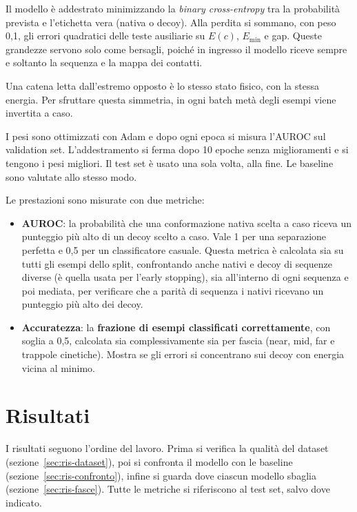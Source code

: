 \documentclass[11pt,a4paper]{article}
\newcommand{\Emin}{E_{\min}}
\begin{document}
Il modello è addestrato minimizzando la \emph{binary cross-entropy} tra la probabilità prevista e l'etichetta vera (nativa o decoy). Alla perdita si sommano, con peso 0,1, gli errori quadratici delle teste ausiliarie su $E(c)$, $\Emin$ e gap. Queste grandezze servono solo come bersagli, poiché in ingresso il modello riceve sempre e soltanto la sequenza e la mappa dei contatti.

Una catena letta dall'estremo opposto è lo stesso stato fisico, con la stessa energia. Per sfruttare questa simmetria, in ogni batch metà degli esempi viene invertita a caso.

I pesi sono ottimizzati con Adam e dopo ogni epoca si misura l'AUROC sul validation set. L'addestramento si ferma dopo 10 epoche senza miglioramenti e si tengono i pesi migliori. Il test set è usato una sola volta, alla fine. Le baseline sono valutate allo stesso modo.

Le prestazioni sono misurate con due metriche:
\begin{itemize}
  \item \textbf{AUROC}: la probabilità che una conformazione nativa scelta a caso riceva un punteggio più alto di un decoy scelto a caso. Vale 1 per una separazione perfetta e 0,5 per un classificatore casuale. Questa metrica è calcolata sia su tutti gli esempi dello split, confrontando anche nativi e decoy di sequenze diverse (è quella usata per l’early stopping), sia all’interno di ogni sequenza e poi mediata, per verificare che a parità di sequenza i nativi ricevano un punteggio più alto dei decoy.
  \item \textbf{Accuratezza}: la \textbf{frazione di esempi classificati correttamente}, con soglia a 0,5, calcolata sia complessivamente sia per fascia (near, mid, far e trappole cinetiche). Mostra se gli errori si concentrano sui decoy con energia vicina al minimo.
\end{itemize}

\section{Risultati}
\label{sec:risultati}

I risultati seguono l'ordine del lavoro. Prima si verifica la qualità del dataset (sezione~\ref{sec:ris-dataset}), poi si confronta il modello con le baseline (sezione~\ref{sec:ris-confronto}), infine si guarda dove ciascun modello sbaglia (sezione~\ref{sec:ris-fasce}). Tutte le metriche si riferiscono al test set, salvo dove indicato.
\end{document}
